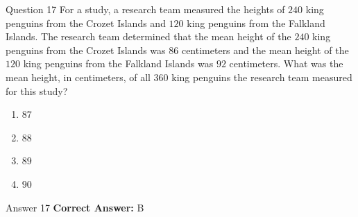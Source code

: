 \documentclass{beamer}
\begin{document}
\begin{frame}{Question 17}
\small
For a study, a research team measured the heights of \(240\) king penguins from the Crozet Islands and \(120\) king penguins from the Falkland Islands.
The research team determined that the mean height of the \(240\) king penguins from the Crozet Islands was \(86\) centimeters and the mean height of the \(120\) king penguins from the Falkland Islands was \(92\) centimeters.
What was the mean height, in centimeters, of all \(360\) king penguins the research team measured for this study?
\vspace{0.35cm}
\begin{enumerate}
    \item[A.] \(87\)
    \item[B.] \(88\)
    \item[C.] \(89\)
    \item[D.] \(90\)
\end{enumerate}
\end{frame}
\begin{frame}{Answer 17}
\small
\textbf{Correct Answer:} B
\end{frame}
\end{document}
